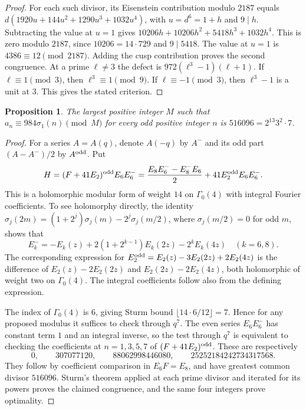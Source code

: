 \documentclass[11pt]{article}
\newtheorem{proposition}[theorem]{Proposition}
\begin{document}
\begin{proof}
For each such divisor, its Eisenstein contribution modulo $2187$
equals $d(1920u+144u^2+1290u^3+1032u^4)$, with $u=d^6=1+h$
and $9\mid h$. Subtracting the value at $u=1$ gives
$10206h+10206h^2+5418h^3+1032h^4$. This is zero modulo $2187$,
since $10206=14\cdot729$ and $9\mid5418$. The value at $u=1$ is
$4386\equiv12\pmod{2187}$. Adding the cusp contribution proves
the second congruence. At a prime $\ell\ne3$ the defect is
$972(\ell^3-1)(\ell+1)$. If $\ell\equiv1\pmod3$, then
$\ell^3\equiv1\pmod9$. If $\ell\equiv-1\pmod3$, then
$\ell^3-1$ is a unit at $3$. This gives the stated criterion.
\end{proof}

\begin{proposition}\label{prop:dyadic-trace}
The largest positive integer $M$ such that
$a_n\equiv984\sigma_1(n)\pmod M$ for every odd positive integer $n$
is $516096=2^{13}3^2\cdot7$.
\end{proposition}
\begin{proof}
For a series $A=A(q)$, denote $A(-q)$ by $A^-$ and its odd part
$(A-A^-)/2$ by $A^{\rm odd}$. Put
\[
 H=(F+41E_2)^{\rm odd} E_6E_6^-
 =\frac{E_8E_6^--E_8^-E_6}{2}
       +41 E_2^{\rm odd}E_6E_6^- .
\]
This is a holomorphic modular form of weight $14$ on $\Gamma_0(4)$
with integral Fourier coefficients. To see holomorphy directly,
the identity
$\sigma_j(2m)=(1+2^j)\sigma_j(m)-2^j\sigma_j(m/2)$,
where $\sigma_j(m/2)=0$ for odd $m$, shows that
\[
 E_k^-=-E_k(z)+2(1+2^{k-1})E_k(2z)-2^kE_k(4z)\quad(k=6,8).
\]
The corresponding expression for
$E_2^{\rm odd}=E_2(z)-3E_2(2z)+2E_2(4z)$ is the difference of
$E_2(z)-2E_2(2z)$ and $E_2(2z)-2E_2(4z)$, both holomorphic
of weight two on $\Gamma_0(4)$. The integral coefficients follow
also from the defining expression.

The index of $\Gamma_0(4)$ is $6$, giving Sturm bound
$\lfloor14\cdot6/12\rfloor=7$. Hence for any proposed modulus it
suffices to check through $q^7$. The even series $E_6E_6^-$ has
constant term $1$ and an integral inverse, so the test through
$q^7$ is equivalent to checking the coefficients at $n=1,3,5,7$
of $(F+41E_2)^{\rm odd}$. These are respectively
\[
 0,\qquad307077120,\qquad88062998446080,\qquad
 25252184242734317568 .
\]
They follow by coefficient comparison in $E_6F=E_8$, and have
greatest common divisor $516096$. Sturm's theorem \cite{sturm} applied at
each prime divisor and iterated for its powers proves the
claimed congruence, and the same four integers prove optimality.
\end{proof}
\end{document}
